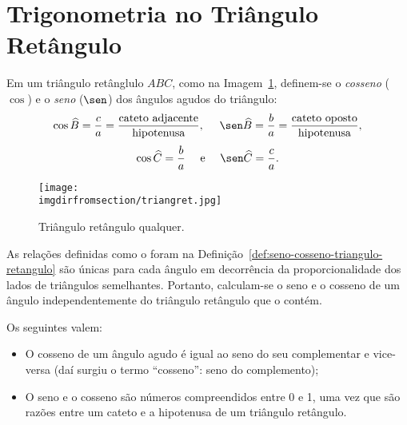 \section{Trigonometria no Triângulo Retângulo}

\begin{definition}
\label{def:seno-cosseno-triangulo-retangulo}
Em um triângulo retânglulo $ABC$, como na Imagem~\ref{fig:triangulo-retangulo}, definem-se o
\emph{cosseno} ($\cos$) e o \emph{seno} ($\sen$) dos ângulos agudos do
triângulo:
%
$$\cos \widehat B = \frac c a = \frac {\text{cateto
adjacente}}{\text{hipotenusa}}, \ \ \ \ \sen \widehat B = \frac b a = \frac
{\text{cateto oposto}}{\text{hipotenusa}},$$
$$\cos \widehat C = \frac b a \ \ \ \ \text{e} \ \ \ \ \sen \widehat
C = \frac c a.$$    
%
\begin{figure}[H]
\centering
\texttt{[image: \\imgdirfromsection/triangret.jpg]}
\caption{Triângulo retângulo qualquer.}
\label{fig:triangulo-retangulo}
\end{figure}
\end{definition}

\begin{remark}
As relações definidas como o foram na Definição~\ref{def:seno-cosseno-triangulo-retangulo} são únicas para cada ângulo em
decorrência da proporcionalidade dos lados de triângulos
semelhantes. Portanto, calculam-se o seno e o cosseno de um ângulo
independentemente do triângulo retângulo que o contém.
\end{remark}

\begin{proposition}
Os seguintes valem:
\begin{itemize}
    \item O cosseno de um ângulo agudo é igual ao seno do seu
    complementar e vice-versa (daí surgiu o termo ``cosseno'': seno do complemento);
    \item O seno e o cosseno são números compreendidos entre 0 e 1, uma vez que são razões entre um cateto 
    e a hipotenusa de um triângulo retângulo.
\end{itemize}
\end{proposition}


